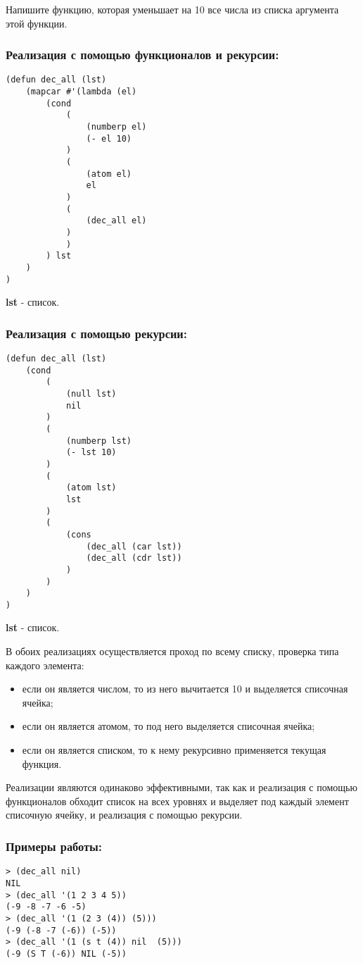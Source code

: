 \documentclass[a4paper,12pt]{article}
\begin{document}
Напишите функцию, которая уменьшает на 10 все числа из списка
 аргумента этой функции.

\subsubsection*{Реализация с помощью функционалов и рекурсии:}
\begin{lstlisting}[caption=Функция уменьшения всех чисел смиска на 10]
(defun dec_all (lst)
	(mapcar #'(lambda (el)
		(cond
			(
				(numberp el)
				(- el 10)
			)
			(
				(atom el)
				el
			)
			(
				(dec_all el)
			)
			)
		) lst
	)
)
\end{lstlisting}
\textbf{lst} - список.

\subsubsection*{Реализация с помощью рекурсии:}
\begin{lstlisting}[caption=Функция уменьшения всех чисел смиска на 10]
(defun dec_all (lst)
	(cond
		(
			(null lst)
			nil
		)
		(
			(numberp lst)
			(- lst 10)
		)
		(
			(atom lst)
			lst
		)
		(
			(cons
				(dec_all (car lst))
				(dec_all (cdr lst))
			)
		)
	)
)
\end{lstlisting}
\textbf{lst} - список.

В обоих реализациях осуществляется проход по всему списку, проверка типа каждого элемента: 
\begin{itemize}
	\item если он является числом, то из него вычитается 10 и выделяется списочная ячейка; 
	\item если он является атомом, то под него выделяется списочная ячейка;
	\item если он является списком, то к нему рекурсивно применяется текущая функция.
\end{itemize}

Реализации являются одинаково эффективными, так как и реализация с помощью функционалов обходит список на всех уровнях и выделяет под каждый элемент списочную ячейку, и реализация с помощью рекурсии.

\subsubsection*{Примеры работы:}
\begin{lstlisting}
> (dec_all nil)
NIL
> (dec_all '(1 2 3 4 5))
(-9 -8 -7 -6 -5)
> (dec_all '(1 (2 3 (4)) (5)))
(-9 (-8 -7 (-6)) (-5))
> (dec_all '(1 (s t (4)) nil  (5)))
(-9 (S T (-6)) NIL (-5))
\end{lstlisting}
\end{document}
